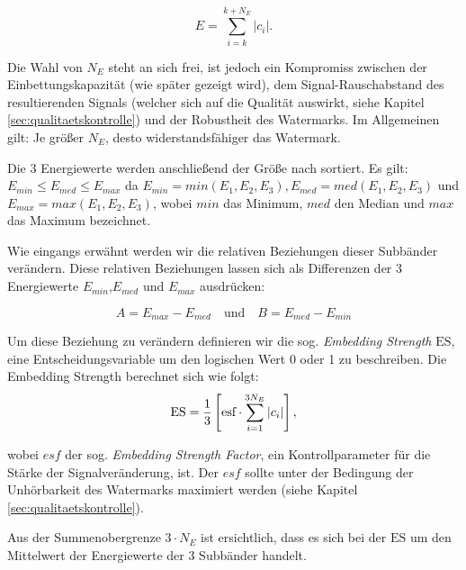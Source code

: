 	\begin{equation}
		E = \sum\limits_{i=k}^{k+{N}_{E}}|c_i|.
		\label{equ:energy}
	\end{equation}

Die Wahl von ${N}_{E}$ steht an sich frei, ist jedoch ein Kompromiss zwischen der Einbettungskapazität (wie später gezeigt wird), dem Signal-Rauschabstand des resultierenden Signals (welcher sich auf die Qualität auswirkt\cite{xiang2007robust}, siehe Kapitel \ref{sec:qualitaetskontrolle}) und der Robustheit des Watermarks. Im Allgemeinen gilt: Je größer ${N}_{E}$, desto widerstandsfähiger das Watermark.

Die 3 Energiewerte werden anschließend der Größe nach sortiert. Es gilt: ${E}_{min}\leq{E}_{med}\leq{E}_{max}$ da ${E}_{min}=min({E}_{1}, {E}_{2}, {E}_{3}), {E}_{med}=med({E}_{1}, {E}_{2}, {E}_{3})$ und ${E}_{max}=max({E}_{1}, {E}_{2}, {E}_{3})$, wobei $min$ das Minimum, $med$ den Median und $max$ das Maximum bezeichnet. 

Wie eingangs erwähnt werden wir die relativen Beziehungen dieser Subbänder verändern. Diese relativen Beziehungen lassen sich als Differenzen der 3 Energiewerte ${E}_{min}$,${E}_{med}$ und ${E}_{max}$ ausdrücken:

	 \begin{equation}
		 A = {E}_{max}-{E}_{med} \quad\mbox{und}\quad B = {E}_{med}-{E}_{min} \label{equ:energydifferences}
	 \end{equation}
	 
Um diese Beziehung zu verändern definieren wir die sog. \textit{Embedding Strength} $\mbox{ES}$, eine Entscheidungsvariable um den logischen Wert 0 oder 1 zu beschreiben. Die Embedding Strength berechnet sich wie folgt:
	\begin{equation}
		\mbox{ES} = {1 \over 3} \left[ \mbox{esf} \cdot \sum\limits_{i=1}^{3{N}_{E}}|c_i| \right],
		\label{equ:embeddingstrength}
	\end{equation}
	
wobei $esf$ der sog. \textit{Embedding Strength Factor}, ein Kontrollparameter für die Stärke der Signalveränderung, ist. Der $esf$ sollte unter der Bedingung der Unhörbarkeit des Watermarks maximiert werden (siehe Kapitel \ref{sec:qualitaetskontrolle}).
	 
Aus der Summenobergrenze $3 \cdot {N}_{E}$ ist ersichtlich, dass es sich bei der $\mbox{ES}$ um den Mittelwert der Energiewerte der 3 Subbänder handelt.

